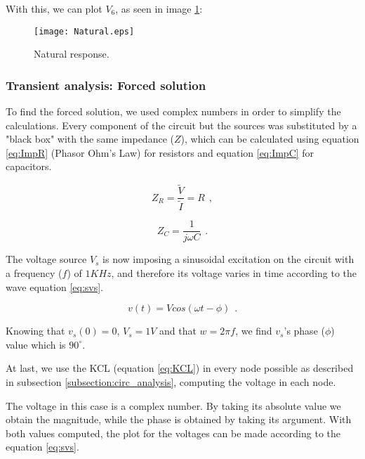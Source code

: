 With this, we can plot $V_6$, as seen in image \ref{fig:NatOc}:


\begin{figure}[H] \centering
    \texttt{[image: Natural.eps]}
    \caption{Natural response.}
    \label{fig:NatOc}
\end{figure}

 

\subsubsection{Transient analysis: Forced solution}
\indent

To find the forced solution, we used complex numbers in order to simplify the calculations. Every component of the circuit but the sources was substituted by a "black box" with the same impedance ($Z$), which can be calculated using equation \ref{eq:ImpR} (Phasor Ohm's Law) for resistors and equation \ref{eq:ImpC} for capacitors.

\begin{equation}
    Z_R=\frac{\widetilde{V}} {\widetilde{I}}=R\hspace{5pt},
    \label{eq:ImpR}
\end{equation}

\begin{equation}
    Z_C=\frac{1}{j \omega C} \hspace{5pt}.
    \label{eq:ImpC}
\end{equation}

The voltage source $V_s$ is now imposing a sinusoidal excitation on the circuit with a frequency ($f$) of $1KHz$, and therefore its voltage varies in time according to the wave equation \ref{eq:svs}.

\begin{equation}
    v(t)=Vcos(\omega t-\phi) \hspace{5pt}.
    \label{eq:svs}
\end{equation}

Knowing that $v_s(0)=0$, $V_s=1 V$ and that $w=2\pi f$, we find $v_s$'s phase ($\phi$) value which is $90^\circ$.

At last, we use the KCL (equation \ref{eq:KCL}) in every node possible as described in subsection \ref{subsection:circ_analysis}, computing the voltage in each node.

The voltage in this case is a complex number. By taking its absolute value we obtain the magnitude, while the phase is obtained by taking its argument. With both values computed, the plot for the voltages can be made according to the equation \ref{eq:svs}.


